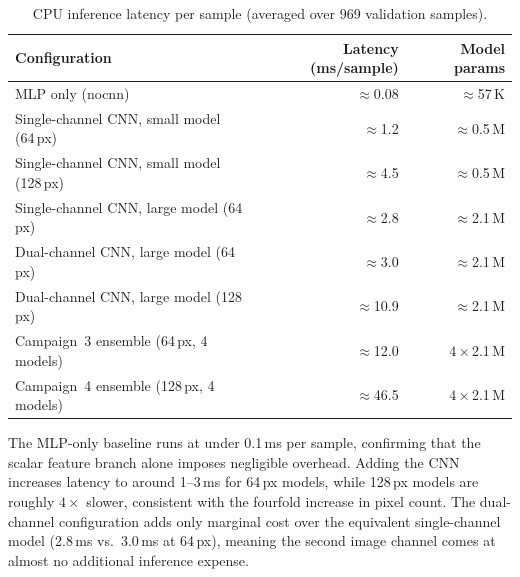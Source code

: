 \begin{table}[h]
  \centering
  \caption{CPU inference latency per sample (averaged over 969 validation samples).}
  \label{tab:inference-latency}
  \begin{tabular}{lrr}
    \toprule
    \textbf{Configuration} & \textbf{Latency (ms/sample)} & \textbf{Model params} \\
    \midrule
    MLP only (nocnn)                              & $\approx$0.08 & $\approx$57\,K \\
    Single-channel CNN, small model (64\,px)      & $\approx$1.2  & $\approx$0.5\,M \\
    Single-channel CNN, small model (128\,px)     & $\approx$4.5  & $\approx$0.5\,M \\
    Single-channel CNN, large model (64\,px)      & $\approx$2.8  & $\approx$2.1\,M \\
    Dual-channel CNN, large model (64\,px)        & $\approx$3.0  & $\approx$2.1\,M \\
    Dual-channel CNN, large model (128\,px)       & $\approx$10.9 & $\approx$2.1\,M \\
    Campaign~3 ensemble (64\,px, 4 models)        & $\approx$12.0 & $4\times$2.1\,M \\
    Campaign~4 ensemble (128\,px, 4 models)       & $\approx$46.5 & $4\times$2.1\,M \\
    \bottomrule
  \end{tabular}
\end{table}

The MLP-only baseline runs at under 0.1\,ms per sample, confirming that the scalar feature branch alone imposes negligible overhead.
Adding the CNN increases latency to around 1--3\,ms for 64\,px models, while 128\,px models are roughly $4\times$ slower, consistent with the fourfold increase in pixel count.
The dual-channel configuration adds only marginal cost over the equivalent single-channel model (2.8\,ms vs.\ 3.0\,ms at 64\,px), meaning the second image channel comes at almost no additional inference expense.

